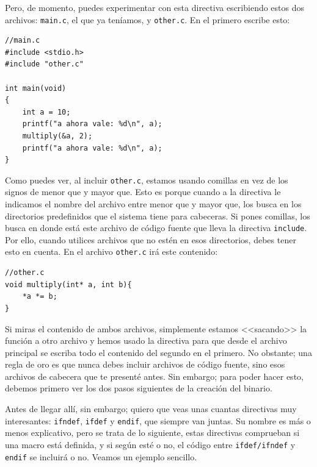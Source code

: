 \documentclass[a4paper]{article}
\begin{document}
Pero, de momento, puedes experimentar con esta directiva escribiendo estos
dos archivos: \verb!main.c!, el que ya teníamos, y \verb!other.c!. En el primero
escribe esto:

\noindent
\begin{minipage}[H]{\linewidth}
\mbox{}
\begin{lstlisting}[style=C,
caption={Ejemplo de directiva \texttt{include}, archivo principal},
label={lst:include1}]
//main.c
#include <stdio.h>
#include "other.c"

int main(void)
{
    int a = 10;
    printf("a ahora vale: %d\n", a);
    multiply(&a, 2);
    printf("a ahora vale: %d\n", a);
}
\end{lstlisting}
\end{minipage}

Como puedes ver, al incluir \verb!other.c!, estamos usando comillas en vez de
los signos de menor que y mayor que. Esto es porque cuando a la directiva le
indicamos el nombre del archivo entre menor que y mayor que, los busca en los
directorios predefinidos que el sistema tiene para cabeceras. Si pones comillas,
los busca en donde está este archivo de código fuente que lleva la directiva
\verb!include!. Por ello, cuando utilices archivos que no estén en esos
directorios, debes tener esto en cuenta. En el archivo \verb!other.c! irá este
contenido:

\noindent
\begin{minipage}[H]{\linewidth}
\mbox{}
\begin{lstlisting}[style=C,
caption={Ejemplo de directiva \texttt{include}, archivo incluido},
label={lst:include2}]
//other.c
void multiply(int* a, int b){
    *a *= b;
}
\end{lstlisting}
\end{minipage}

Si miras el contenido de ambos archivos, simplemente estamos <<sacando>> la
función a otro archivo y hemos usado la directiva para que desde el archivo
principal se escriba todo el contenido del segundo en el primero. No obstante;
una regla de oro es que nunca debes incluir archivos de código fuente, sino esos
archivos de cabecera que te presenté antes. Sin embargo;
para poder hacer esto, debemos primero ver los dos pasos siguientes de la
creación del binario.

Antes de llegar allí, sin embargo; quiero que veas unas cuantas directivas muy
interesantes: \verb!ifndef!, \verb!ifdef! y
\verb!endif!, que siempre van juntas. Su nombre
es más o menos explicativo, pero se trata de lo siguiente, estas directivas
comprueban si una macro está definida, y si según esté o no, el código
entre \verb!ifdef/ifndef! y \verb!endif! se incluirá o no. Veamos un ejemplo
sencillo.
\end{document}

